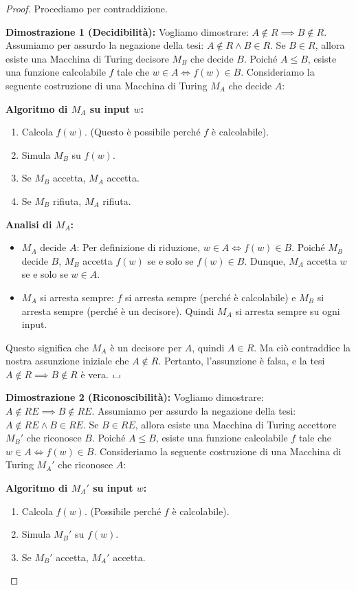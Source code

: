\documentclass[a4paper]{article}
\newcommand{\blankS}{\ensuremath{\raisebox{-0.15ex}{\scalebox{1.3}[0.7]{$\sqcup$}}\mkern2mu}}
\theoremstyle{definition} %
\begin{document}
\begin{proof}
Procediamo per contraddizione.

\textbf{Dimostrazione 1 (Decidibilità):}
Vogliamo dimostrare: $A \notin R \implies B \notin R$.
Assumiamo per assurdo la negazione della tesi: $A \notin R \land B \in R$.
Se $B \in R$, allora esiste una Macchina di Turing decisore $M_B$ che decide $B$.
Poiché $A \le B$, esiste una funzione calcolabile $f$ tale che $w \in A \iff f(w) \in B$.
Consideriamo la seguente costruzione di una Macchina di Turing $M_A$ che decide $A$:

\textbf{Algoritmo di $M_A$ su input $w$:}
\begin{enumerate}
    \item Calcola $f(w)$. (Questo è possibile perché $f$ è calcolabile).
    \item Simula $M_B$ su $f(w)$.
    \item Se $M_B$ accetta, $M_A$ accetta.
    \item Se $M_B$ rifiuta, $M_A$ rifiuta.
\end{enumerate}

\textbf{Analisi di $M_A$:}
\begin{itemize}
    \item $M_A$ decide $A$: Per definizione di riduzione, $w \in A \iff f(w) \in B$. Poiché $M_B$ decide $B$, $M_B$ accetta $f(w)$ se e solo se $f(w) \in B$. Dunque, $M_A$ accetta $w$ se e solo se $w \in A$.
    \item $M_A$ si arresta sempre: $f$ si arresta sempre (perché è calcolabile) e $M_B$ si arresta sempre (perché è un decisore). Quindi $M_A$ si arresta sempre su ogni input.
\end{itemize}
Questo significa che $M_A$ è un decisore per $A$, quindi $A \in R$.
Ma ciò contraddice la nostra assunzione iniziale che $A \notin R$.
Pertanto, l'assunzione è falsa, e la tesi $A \notin R \implies B \notin R$ è vera.
$\blankS$

\textbf{Dimostrazione 2 (Riconoscibilità):}
Vogliamo dimostrare: $A \notin RE \implies B \notin RE$.
Assumiamo per assurdo la negazione della tesi: $A \notin RE \land B \in RE$.
Se $B \in RE$, allora esiste una Macchina di Turing accettore $M_B'$ che riconosce $B$.
Poiché $A \le B$, esiste una funzione calcolabile $f$ tale che $w \in A \iff f(w) \in B$.
Consideriamo la seguente costruzione di una Macchina di Turing $M_A'$ che riconosce $A$:

\textbf{Algoritmo di $M_A'$ su input $w$:}
\begin{enumerate}
    \item Calcola $f(w)$. (Possibile perché $f$ è calcolabile).
    \item Simula $M_B'$ su $f(w)$.
    \item Se $M_B'$ accetta, $M_A'$ accetta.
\end{enumerate}


\end{proof}
\end{document}
